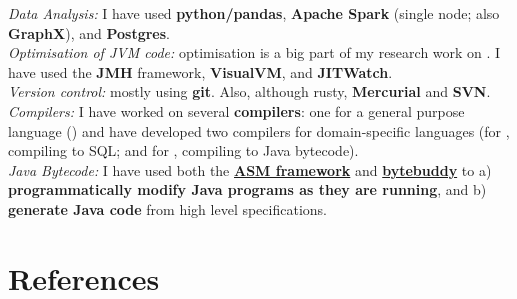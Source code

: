 \documentclass[10pt]{article} %
\begin{document}
 {

  \textit{Data Analysis:} I have used \textbf{python/pandas},
  \textbf{Apache Spark} (single node; also \textbf{GraphX}), and \textbf{Postgres}.\\[1mm]
  \textit{Optimisation of JVM code:} optimisation is a big part of my research work on
  \secret{}. I have used the \textbf{JMH} framework, \textbf{VisualVM}, and \textbf{JITWatch}.\\[1mm]
  \textit{Version control:} mostly using \textbf{git}. Also, although rusty,
  \textbf{Mercurial} and \textbf{SVN}.\\[1mm]
  \textit{Compilers:} I have worked on several \textbf{compilers}: one for a
  general purpose language (\encore{}) and have developed two compilers for
  domain-specific languages (for \spencer{}, compiling to SQL; and for \secret{},
  compiling to
  Java bytecode).\\[1mm]
  \textit{Java Bytecode:} I have used both the \textbf{\href{foo}{ASM
      framework}} and \textbf{\href{https://bytebuddy.net}{bytebuddy}} to a)
  \textbf{programmatically modify Java programs as they are running}, and b)
  \textbf{generate Java code} from high level specifications.}


\section{References}

\end{document}
